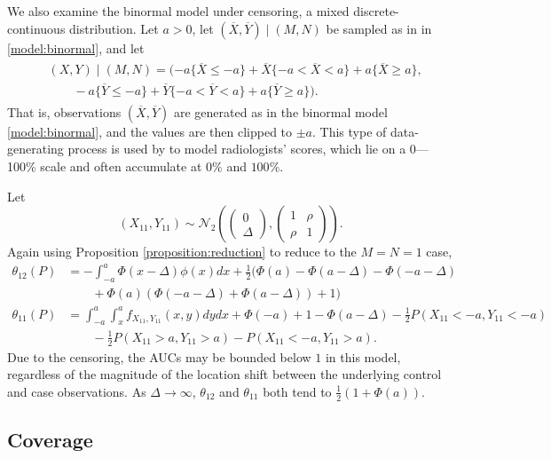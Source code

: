 \documentclass[12pt]{article}
\DeclareMathOperator{\AUC}{AUC}
\newcommand{\cind}{\perp \!\!\! \perp}
\newcommand{\aucindiv}{\theta_{11}}%
\newcommand{\aucpop}{\theta_{12}}%
\newcommand{\bnd}{a}
\begin{document}
We also examine the binormal model under censoring, a mixed
discrete-continuous distribution. Let $\bnd>0$, let
$(\overline X,\overline Y)\mid (M,N)$ be sampled as in in
\eqref{model:binormal}, and let
\begin{gather}
  \begin{aligned}
    \label{model:censored binormal}
  &(X,Y) \mid (M,N) =(-\bnd\{\overline{X}\le-\bnd\}+\overline X\{-\bnd<\overline X <\bnd\} + a\{\overline X\ge a\},\\
  &\qquad
  -\bnd\{\overline{Y}\le-\bnd\}+\overline Y\{-\bnd<\overline Y <\bnd\} + a\{\overline Y\ge a\}).
\end{aligned}
\end{gather}
That is, observations $(\overline X,\overline Y)$ are generated as in the binormal model
\eqref{model:binormal}, and the values are then clipped to $\pm \bnd$.
This type of data-generating process is used by \citep{obuchowski1997} to model
radiologists' scores, which lie on a 0---100\% scale and often
accumulate at $0\%$ and $100\%$.

Let
$$(X_{11},Y_{11})\sim \mathcal{N}_2\left(\begin{pmatrix} 0 \\ \Delta \end{pmatrix},
  \begin{pmatrix} 1 & \rho \\ \rho & 1 \end{pmatrix}
\right).$$
Again using Proposition \ref{proposition:reduction} to reduce to the $M=N=1$ case,
\begin{align}
  \aucpop(P) &=-\int_{-\bnd}^\bnd\Phi(x-\Delta)\phi(x)dx + \frac12(\Phi(\bnd)-\Phi(\bnd-\Delta)-\Phi(-\bnd-\Delta)\\
  &\qquad+\Phi(\bnd)(\Phi(-\bnd-\Delta)+\Phi(\bnd-\Delta))+1)\\               
  \aucindiv(P) &=\int_{-\bnd}^\bnd\int_x^\bnd f_{X_{11},Y_{11}}(x,y)dydx + \Phi(-a) + 1 - \Phi(\bnd-\Delta) - \frac12 P(X_{11}<-\bnd,Y_{11}<-\bnd)\\
  &\qquad - \frac12 P(X_{11}>\bnd,Y_{11}>\bnd) - P(X_{11}< -\bnd, Y_{11}>\bnd).
\end{align}
Due to the censoring, the AUCs may be bounded below $1$ in this
model, regardless of the magnitude of the location shift between the underlying control and
case observations. As $\Delta\to\infty$, $\aucpop$ and $\aucindiv$
both tend to $\frac12(1+\Phi(\bnd))$.


\subsection{Coverage}\label{section:simulation:coverage}
\end{document}
